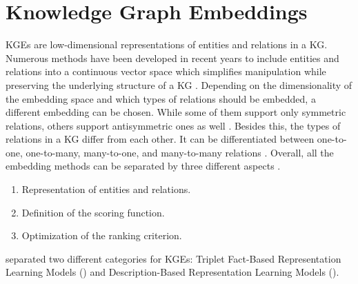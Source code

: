 \section{Knowledge Graph Embeddings} 
\label{sec:knowledge_graph_embeddings}
%
\acfp{KGE} are low-dimensional representations of entities and relations in a \ac{KG}. 
Numerous methods have been developed in recent years to include entities and relations into a continuous vector
space which simplifies manipulation while preserving the underlying structure of a KG \cite{8047276}.
Depending on the dimensionality of the embedding space and which types of relations should be embedded, a different embedding can be chosen.
While some of them support only symmetric relations, others support antisymmetric ones as well \cite{8047276}. 
Besides this, the types of relations in a \ac{KG} differ from each other.
It can be differentiated between one-to-one, one-to-many, many-to-one, and many-to-many relations \cite{8047276}.
Overall, all the embedding methods can be separated by three different aspects \cite{electronics9050750}.
\begin{enumerate}
    \item 
    Representation of entities and relations.
    
    \item 
    Definition of the scoring function.
    
    \item 
    Optimization of the ranking criterion.
\end{enumerate}
\cite{electronics9050750} separated two different categories for \acp{KGE}: Triplet Fact-Based Representation Learning Models () and Description-Based Representation Learning Models ().








